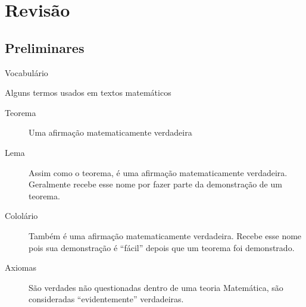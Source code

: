 \chapter{Revisão}
\label{cap:revisao}

\section{Preliminares}

\begin{teoria}{Vocabulário}
    
    Alguns termos usados em textos matemáticos
    \begin{description}
        \item[Teorema] Uma afirmação matematicamente verdadeira
        \item[Lema] Assim como o teorema, é uma afirmação matematicamente verdadeira. Geralmente recebe esse nome por fazer parte da demonstração de um teorema.
        \item[Cololário] Também é uma afirmação matematicamente verdadeira. Recebe esse nome pois sua demonstração é ``fácil'' depois que um teorema foi demonstrado.
        \item[Axiomas] São verdades não questionadas dentro de uma teoria Matemática, são consideradas ``evidentemente'' verdadeiras.
    \end{description}

\end{teoria}

